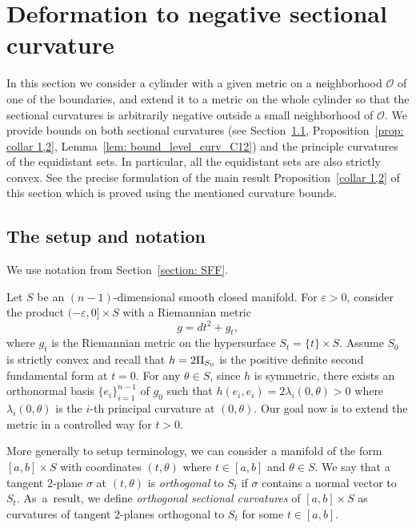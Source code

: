 \documentclass[JEP,XML,SOM,Unicode,NoFloatCountersInSection]{cedram}
\theoremstyle{definition}
\let\eps\varepsilon
\newcommand{\RomanNumeralCaps}[1]
{\MakeUppercase{\romannumeral #1}}
\newcommand{\II}{\textup{\RomanNumeralCaps{2}}}
\renewcommand{\>}{{\rangle}}
\newcommand{\<}{{\langle}}
\begin{document}
\section{Deformation to negative sectional curvature}\label{construction 1}

In this section we consider a cylinder with a given metric on a neighborhood $\mathcal O$ of one of the boundaries, and extend it to a metric on the whole cylinder so that the sectional curvatures is arbitrarily negative outside a small neighborhood of $\mathcal O$. We provide bounds on both sectional curvatures (see Section~\ref{setup notation}, Proposition~\ref{prop: collar 1,2}, Lemma~\ref{lem: bound_level_curv_C12}) and the principle curvatures of the equidistant sets. In particular, all the equidistant sets are also strictly convex. See the precise formulation of the main result Proposition~\ref{collar 1,2} of this section which is proved using the mentioned curvature bounds.

\subsection{The setup and notation}\label{setup notation}

We use notation from Section~\ref{section: SFF}.

Let $S$ be an $(n-1)$-dimensional smooth closed manifold. For $\eps>0$, consider the product $(-\eps,0]\times S$ with a Riemannian metric
\begin{equation}\label{isometry_boundary}
g = dt^2+g_t,
\end{equation}
where $g_t$ is the Riemannian metric on the hypersurface $S_t=\{t\}\times S$. Assume $S_0$ is strictly convex and recall that $h=2\II_{S_0}$ is the positive definite second fundamental form at $t=0$.
For any $\theta\in S$, since $h$ is symmetric, there exists an orthonormal basis $\{e_i\}_{i=1}^{n-1}$ of $g_0$ such that $h(e_i,e_i)=2\lambda_i(0,\theta)>0$ where $\lambda_i(0,\theta)$ is the $i$-th principal curvature at $(0,\theta)$.
Our goal now is to extend the metric in a controlled way for $t>0$.

More generally to setup terminology, we can consider a manifold of the form \hbox{$[a,b]\times S$} with coordinates $(t,\theta)$ where $t\in[a,b]$ and $\theta\in S$. We say that a tangent $2$-plane $\sigma$ at $(t,\theta)$ is \textit{orthogonal} to $S_t$ if $\sigma$ contains a normal vector to $S_t$. As~a~result, we define \textit{orthogonal sectional curvatures} of $[a,b]\times S$ as curvatures of tangent $2$-planes orthogonal to $S_t$ for some $t\in[a,b]$.
\end{document}
